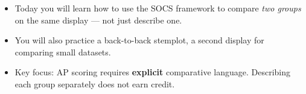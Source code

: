 \documentclass[10pt]{article}
\begin{document}
\vspace{0.14in}

\begin{tcolorbox}[colback=greenbg, colframe=greenacc, boxrule=0.8pt, arc=2mm,
    left=4mm, right=4mm, top=3mm, bottom=3mm]
\small
\begin{itemize}[leftmargin=1.3em, itemsep=5pt]
  \item Today you will learn how to use the SOCS framework to compare
        \textit{two groups} on the same display --- not just describe one.
  \item You will also practice a back-to-back stemplot, a second display
        for comparing small datasets.
  \item Key focus: AP scoring requires \textbf{explicit} comparative
        language. Describing each group separately does not earn credit.
\end{itemize}
\end{tcolorbox}
\end{document}
